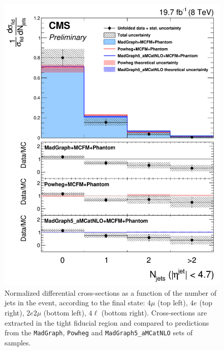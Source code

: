 \begin{figure}[hbtp]
\begin{center}
    \includegraphics[width=\cmsFigWidth]{Figures/DiffCrossSecZZTo4lJets_Unfolded_fr_MadGraph_norm.png}       
    \caption{\footnotesize{Normalized differential cross-sections as a function of the number of jets in the event, according to the final state: $4\mu$ (top left), $4e$ (top right), $2e2\mu$  (bottom left),  $4\ell$ (bottom right). Cross-sections are extracted in the tight fiducial region and compared to predictions from the \texttt{MadGraph}, \texttt{Powheg} and \texttt{MadGraph5\_aMCatNLO} sets of samples.}}
    \label{fig:diff_xs_jets}
  \end{center}
\end{figure}

